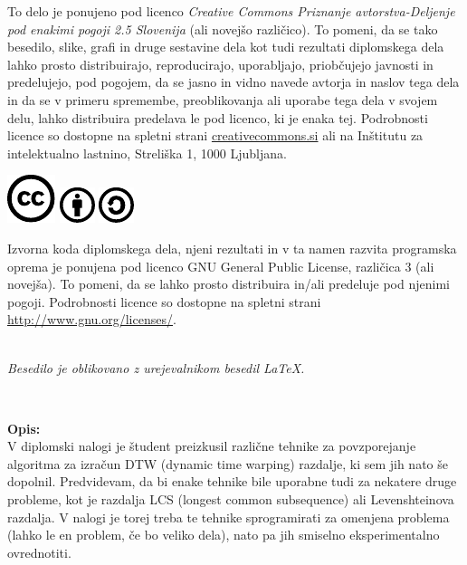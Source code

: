 \documentclass[a4paper,12pt,openright]{book}
\newcommand{\clearemptydoublepage}{\newpage{\pagestyle{empty}\cleardoublepage}}
\newcommand{\CcImageCc}[1]{%
	\includegraphics[scale=#1]{cc_cc_30.pdf}%
}
\newcommand{\CcImageBy}[1]{%
	\includegraphics[scale=#1]{cc_by_30.pdf}%
}
\newcommand{\CcImageSa}[1]{%
	\includegraphics[scale=#1]{cc_sa_30.pdf}%
}
\begin{document}
\newpage
\thispagestyle{empty}

\vspace*{5cm}
{\small \noindent
To delo je ponujeno pod licenco \textit{Creative Commons Priznanje avtorstva-Deljenje pod enakimi pogoji 2.5 Slovenija} (ali novej\v so razli\v cico).
To pomeni, da se tako besedilo, slike, grafi in druge sestavine dela kot tudi rezultati diplomskega dela lahko prosto distribuirajo,
reproducirajo, uporabljajo, priobčujejo javnosti in predelujejo, pod pogojem, da se jasno in vidno navede avtorja in naslov tega
dela in da se v primeru spremembe, preoblikovanja ali uporabe tega dela v svojem delu, lahko distribuira predelava le pod
licenco, ki je enaka tej.
Podrobnosti licence so dostopne na spletni strani \href{http://creativecommons.si}{creativecommons.si} ali na Inštitutu za
intelektualno lastnino, Streliška 1, 1000 Ljubljana.

\vspace*{1cm}
\begin{center}%
\CcImageCc{0.741573033707865}\hspace*{1ex}\CcImageBy{1}\hspace*{1ex}\CcImageSa{1}%
\end{center}
}

\vspace*{1cm}
{\small \noindent
Izvorna koda diplomskega dela, njeni rezultati in v ta namen razvita programska oprema je ponujena pod licenco GNU General Public License,
različica 3 (ali novejša). To pomeni, da se lahko prosto distribuira in/ali predeluje pod njenimi pogoji.
Podrobnosti licence so dostopne na spletni strani \url{http://www.gnu.org/licenses/}.
}

\vfill
\begin{center} 
\ \\ \vfill
{\em
Besedilo je oblikovano z urejevalnikom besedil \LaTeX.}
\end{center}

\clearemptydoublepage

\thispagestyle{empty}
\
\vfill

\bigskip
\noindent\textbf{Opis:}\\
V diplomski nalogi \cite{diplomaPremk} je študent preizkusil različne tehnike za povzporejanje algoritma za izračun DTW (dynamic time warping) razdalje, ki sem jih nato še dopolnil. Predvidevam, da bi enake tehnike bile uporabne tudi za nekatere druge probleme, kot je razdalja LCS (longest common subsequence) ali Levenshteinova razdalja. V nalogi je torej treba te tehnike sprogramirati za omenjena problema (lahko le en problem, če bo veliko dela), nato pa jih smiselno eksperimentalno ovrednotiti.
\end{document}
